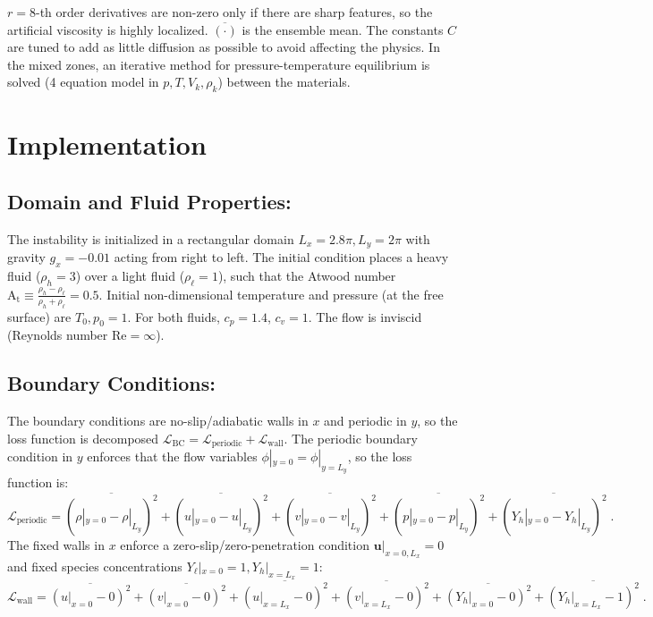 \documentclass{homework}
\begin{document}
$r=8$-th order derivatives are non-zero only if there are sharp features, so the artificial viscosity is highly localized. $\overline{(\cdot)}$ is the ensemble mean. The constants $C$ are tuned to add as little diffusion as possible to avoid affecting the physics. In the mixed zones, an iterative method for pressure-temperature equilibrium is solved (4 equation model in $p, T, V_k, \rho_k$) between the materials.

\section{Implementation}

\subsection*{Domain and Fluid Properties: \qquad}
The instability is initialized in a rectangular domain $L_x = 2.8 \pi, L_y = 2\pi$ with gravity $g_x = -0.01$ acting from right to left. The initial condition places a heavy fluid ($\rho_h = 3$) over a light fluid ($\rho_\ell = 1$), such that the Atwood number $\mathrm{A_t} \equiv \tfrac{\rho_h - \rho_\ell}{\rho_h + \rho_\ell} = 0.5$. Initial non-dimensional temperature and pressure (at the free surface) are $T_0 , p_0 = 1$. For both fluids,  $c_p = 1.4$, $c_v = 1$. The flow is inviscid (Reynolds number $\mathrm{Re} = \infty$).

\subsection*{Boundary Conditions: \qquad}
The boundary conditions are no-slip/adiabatic walls in $x$ and periodic in $y$, so the loss function is decomposed $\mathcal{L}_\mathrm{BC} = \mathcal{L}_\mathrm{periodic} + \mathcal{L}_\mathrm{wall}$. The periodic boundary condition in $y$ enforces that the flow variables $\phi|_{y=0} = \phi|_{y=L_y}$, so the loss function is: 
$$ \mathcal{L}_\mathrm{periodic} = \overline{(\rho|_{y=0}-\rho|_{L_y})^2} + \overline{(u|_{y=0}-u|_{L_y})^2} + \overline{(v|_{y=0}-v|_{L_y})^2} + \overline{(p|_{y=0}-p|_{L_y})^2} + \overline{(Y_h|_{y=0}-Y_h|_{L_y})^2} \; .$$
The fixed walls in $x$ enforce a zero-slip/zero-penetration condition $\mathbf{u}|_{x=0,L_x} = 0$ and fixed species concentrations $Y_\ell|_{x=0} = 1, Y_h|_{x=L_x} = 1$:
$$ \mathcal{L}_\mathrm{wall} = \overline{(u|_{x=0}-0)^2} + \overline{(v|_{x=0}-0)^2} + \overline{(u|_{x=L_x}-0)^2} + \overline{(v|_{x=L_x}-0)^2} + \overline{(Y_h|_{x=0}-0)^2} + \overline{(Y_h|_{x=L_x}-1)^2} \; .$$
\end{document}
